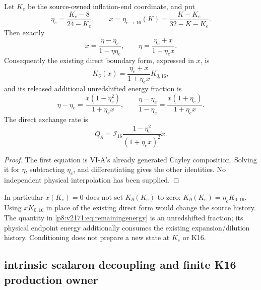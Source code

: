 \documentclass[12pt,a4paper]{article}
\begin{document}
\begin{proposition}
\label{p8:v2171:prop:conditioning}
Let $K_e$ be the source-owned inflation-end coordinate, and put
\[
 \eta_e=\frac{K_e-8}{24-K_e},\qquad
 x=\eta_{e\to16}(K)=\frac{K-K_e}{32-K-K_e}.
\]
Then exactly
\begin{equation}
 x=\frac{\eta-\eta_e}{1-\eta\eta_e},\qquad
 \eta=\frac{\eta_e+x}{1+\eta_ex}.
 \label{p8:v2171:eq:conditioning}
\end{equation}
Consequently the existing direct boundary form, expressed in $x$, is
\begin{equation}
 K_\partial(x)=\frac{\eta_e+x}{1+\eta_ex}K_{0,16},
 \label{p8:v2171:eq:retainedcell}
\end{equation}
and its released additional unredshifted energy fraction is
\begin{equation}
 \eta-\eta_e=\frac{x(1-\eta_e^2)}{1+\eta_ex},\qquad
 \frac{\eta-\eta_e}{1-\eta_e}
 =\frac{x(1+\eta_e)}{1+\eta_ex}.
 \label{p8:v2171:eq:remainingenergy}
\end{equation}
The direct exchange rate is
\begin{equation}
 Q_\partial=\mathcal I_{16}
 \frac{1-\eta_e^2}{(1+\eta_ex)^2}\dot x.
 \label{p8:v2171:eq:conditionedflux}
\end{equation}
\end{proposition}
\begin{proof}
The first equation is VI-A's already generated Cayley composition. Solving
it for $\eta$, subtracting $\eta_e$, and differentiating gives the other
identities. No independent physical interpolation has been supplied.
\end{proof}
In particular $x(K_e)=0$ does not set $K_\partial(K_e)$ to zero:
$K_\partial(K_e)=\eta_eK_{0,16}$. Using $xK_{0,16}$ in place of the
existing direct form would change the source history. The quantity in
\eqref{p8:v2171:eq:remainingenergy} is an unredshifted fraction; its physical
endpoint energy additionally consumes the existing expansion/dilution
history. Conditioning does not prepare a new state at $K_e$ or K16.




\subsection{intrinsic scalaron decoupling and finite K16 production owner}
\label{p8:sec:v2178-c06-native-production-owner}
\end{document}
